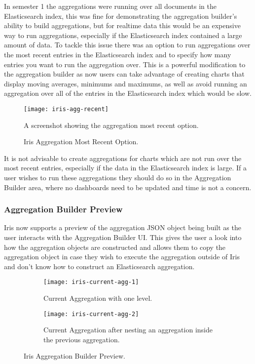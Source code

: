 \documentclass[12pt,a4paper,titlepage]{report}
\begin{document}
In semester 1 the aggregations were running over all documents in the Elasticsearch index, this was fine for demonstrating the aggregation builder's ability to build aggregations, but for realtime data this would be an expensive way to run aggregations, especially if the Elasticsearch index contained a large amount of data. To tackle this issue there was an option to run aggregations over the most recent entries in the Elasticsearch index and to specify how many entries you want to run the aggregation over. This is a powerful modification to the aggregation builder as now users can take advantage of creating charts that display moving averages, minimums and maximums, as well as avoid running an aggregation over all of the entries in the Elasticsearch index which would be slow. 
\begin{figure}[H]
\begin{tcolorbox}
\begin{center}
\texttt{[image: iris-agg-recent]}
\end{center}
A screenshot showing the aggregation most recent option.
\end{tcolorbox}
\caption{Iris Aggregation Most Recent Option.}
\end{figure}

It is not advisable to create aggregations for charts which are not run over the most recent entries, especially if the data in the Elasticsearch index is large. If a user wishes to run these aggregations they should do so in the Aggregation Builder area, where no dashboards need to be updated and time is not a concern.

\subsubsection{Aggregation Builder Preview}
Iris now supports a preview of the aggregation JSON object being built as the user interacts with the Aggregation Builder UI. This gives the user a look into how the aggregation objects are constructed and allows them to copy the aggregation object in case they wish to execute the aggregation outside of Iris and don't know how to construct an Elasticsearch aggregation.
\begin{figure}[H]
\begin{tcolorbox}
\begin{center}
\begin{subfigure}{0.5\textwidth}
\centering
\texttt{[image: iris-current-agg-1]}
\caption{Current Aggregation with one level.}
\end{subfigure}%
\begin{subfigure}{0.5\textwidth}
\centering
\texttt{[image: iris-current-agg-2]}
\caption{Current Aggregation after nesting an aggregation inside the previous aggregation.}
\end{subfigure}
\end{center}
\end{tcolorbox}
\caption{Iris Aggregation Builder Preview.}
\end{figure}
\end{document}
